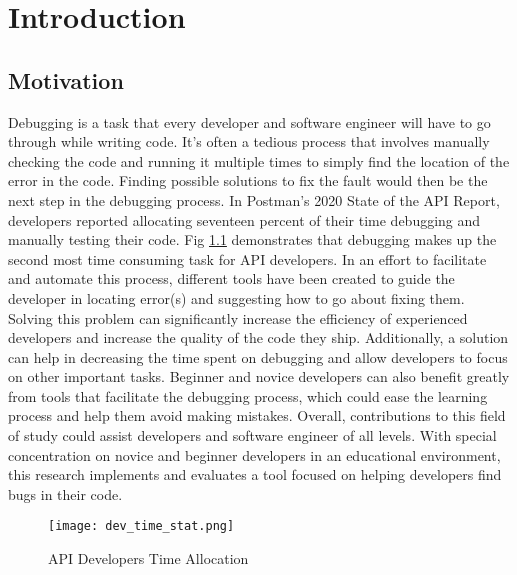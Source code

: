 \chapter{Introduction}
\label{ch:intro}

\section{Motivation}
\label{sec:motivation}


Debugging is a task that every developer and software engineer will have to go
through while writing code. It's often a
tedious process that involves manually checking the code and running it multiple
times to simply find the location of the error in the code. Finding possible
solutions to fix the fault would then be the next step in the debugging process.
In Postman's 2020 State of the API Report, developers reported allocating
seventeen percent of their time debugging and manually testing their code.
Fig \ref{fig:development_time} demonstrates that debugging makes up the
second most time consuming task for API developers.
In an effort to facilitate and automate this process, different tools have been
created to guide the developer in locating error(s) and suggesting how to go
about fixing them. Solving this problem can significantly increase the
efficiency of experienced developers and increase the quality of the code they
ship. Additionally, a solution can help in decreasing the time spent on
debugging and allow developers to focus on other important tasks.
Beginner and novice developers can also benefit greatly from tools
that facilitate the debugging process, which could ease the learning process and help
them avoid making mistakes. Overall, contributions to this field of study could
assist developers and software engineer of all levels.
With special concentration on novice and beginner developers in an educational
environment, this research implements and evaluates a tool focused on helping
developers find bugs in their code.

\begin{figure}[!htb]
	\begin{center}
		\texttt{[image: dev\_time\_stat.png]}
		\caption{\label{fig:development_time} API Developers Time Allocation}
	\end{center}
\end{figure}


